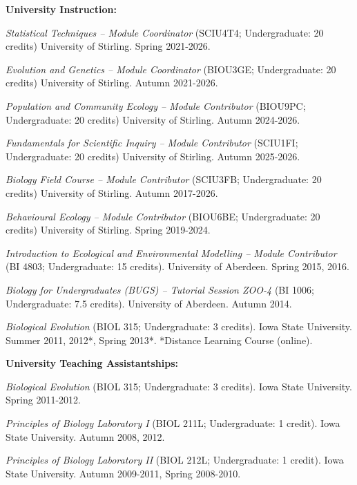 \documentclass[letterpaper]{article}
\renewenvironment{itemize}{
  \begin{list}{}{
    \setlength{\leftmargin}{1.5em}
  }
}{
  \end{list}
}
\begin{document}
\begin{itemize}
\item {\bf University Instruction:}
\begin{itemize}
\item[$\bullet$]{{\it Statistical Techniques -- Module Coordinator} (SCIU4T4; Undergraduate: 20 credits) University of Stirling. Spring 2021-2026.}
\item[$\bullet$]{{\it Evolution and Genetics -- Module Coordinator} (BIOU3GE; Undergraduate: 20 credits) University of Stirling. Autumn 2021-2026.}
\item[$\bullet$]{{\it Population and Community Ecology -- Module Contributor} (BIOU9PC; Undergraduate: 20 credits) University of Stirling. Autumn 2024-2026.}
\item[$\bullet$]{{\it Fundamentals for Scientific Inquiry -- Module Contributor} (SCIU1FI; Undergraduate: 20 credits) University of Stirling. Autumn 2025-2026.}
\item[$\bullet$]{{\it Biology Field Course -- Module Contributor} (SCIU3FB; Undergraduate: 20 credits) University of Stirling. Autumn 2017-2026.}
\item[$\bullet$]{{\it Behavioural Ecology -- Module Contributor} (BIOU6BE; Undergraduate: 20 credits) University of Stirling. Spring 2019-2024.}
\item[$\bullet$]{{\it Introduction to Ecological and Environmental Modelling -- Module Contributor} (BI 4803; Undergraduate: 15 credits). University of Aberdeen. Spring 2015, 2016.}
\item[$\bullet$]{{\it Biology for Undergraduates (BUGS) -- Tutorial Session ZOO-4} (BI 1006; Undergraduate: 7.5 credits). University of Aberdeen. Autumn 2014.}
\item[$\bullet$]{{\it Biological Evolution} (BIOL 315; Undergraduate: 3 credits). Iowa State University. Summer 2011, 2012*, Spring 2013*. *Distance Learning Course (online).}
\end{itemize}

\item {\bf University Teaching Assistantships:}
\begin{itemize}
\item[$\bullet$]{{\it Biological Evolution} (BIOL 315; Undergraduate: 3 credits). Iowa State University. Spring 2011-2012.}
\item[$\bullet$]{{\it Principles of Biology Laboratory I} (BIOL 211L; Undergraduate: 1 credit). Iowa State University. Autumn 2008, 2012.}
\item[$\bullet$]{{\it Principles of Biology Laboratory II} (BIOL 212L; Undergraduate: 1 credit). Iowa State University. Autumn 2009-2011, Spring 2008-2010.}
\end{itemize}


\end{itemize}
\end{document}
